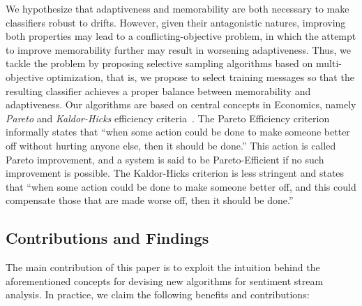 \documentclass{sig-alternate}
\begin{document}
We hypothesize that adaptiveness and memorability are both necessary to make classifiers robust to drifts. 
However, given their antagonistic natures, improving both properties may lead to a conflicting-objective problem, in which the attempt to improve memorability further may result in worsening adaptiveness.
Thus, we tackle the problem
by proposing selective sampling algorithms based on multi-objective optimization, that is, we propose to select training messages so that the resulting classifier achieves a proper balance between memorability and adaptiveness.
Our algorithms are based on
central concepts in Economics, namely {\em Pareto} and {\em Kaldor-Hicks} efficiency criteria~\cite{palda@book,kaldor,hicks}. The Pareto Efficiency criterion informally states
that ``when some action could be done to make someone better off without
hurting anyone else, then it should be done.'' This action is called Pareto improvement,
and a system is said to be Pareto-Efficient if no such improvement is possible.
The Kaldor-Hicks criterion is less stringent and states that ``when some action could be done to make someone better off, and this could compensate those that are made worse off, then it should be done.''

\subsection*{Contributions and Findings}
The main contribution of this paper is to exploit the intuition behind the aforementioned concepts for devising new algorithms for sentiment stream analysis.
In practice, we claim the following benefits and contributions:
\end{document}
